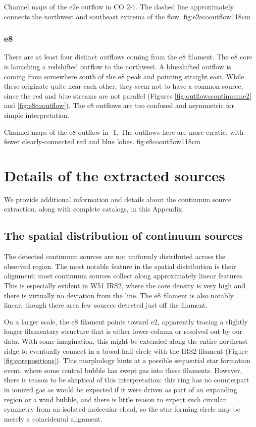 \documentclass{emulateapj}
\begin{document}
{Channel maps of the e2e outflow in CO 2-1.  The dashed line approximately
connects the northwest and southeast extrema of the flow.}
{fig:e2ecooutflow}{1}{18cm}

\subsubsection{e8}
There are at least four distinct outflows coming from the e8 filament.
The e8 core is launching a redshifted outflow to the northwest.  A blueshifted
outflow is coming from somewhere south of the e8 peak and pointing straight
east.  While these originate quite near each other, they seem not to have
a common source, since the red and blue streams are not parallel (Figures
\ref{fig:outflowscontinuume2} and \ref{fig:e8cooutflow}).  The e8 outflows are too
confused and asymmetric for simple interpretation.


{Channel maps of the e8 outflow in -1.  The outflows here are more
erratic, with fewer clearly-connected red and blue lobes.}
{fig:e8cooutflow}{1}{18cm}

\section{Details of the extracted sources}
\label{sec:contsrcs}
We provide additional information and details about the continuum
source extraction, along with complete catalogs, in this Appendix.

\subsection{The spatial distribution of continuum sources}
\label{sec:corespatialdistribution}
The detected continuum sources are not uniformly distributed across the
observed region.  The most notable feature in the spatial distribution is their
alignment: most continuum sources collect along approximately linear features.
This is especially evident in W51 IRS2, where the core density is very high and
there is virtually no deviation from the line.  The e8 filament is also notably
linear, though there area few sources detected just off the filament. 

On a larger scale, the e8 filament points toward e2, apparently tracing a
slightly longer filamentary structure that is either lower-column or resolved
out by our data.  With some imagination, this might be extended along the
entire northeast ridge to eventually connect in a broad half-circle with the
IRS2 filament (Figure \ref{fig:corepositions}).  This morphology hints at a
possible sequential star formation event, where some central bubble has swept
gas into these filaments.  However, there is reason to be skeptical of this
interpretation: this ring has no counterpart in ionized gas as would be
expected if it were driven as part of an expanding \hii region or a wind
bubble, and there is little reason to expect such circular symmetry from an
isolated molecular cloud, so the star forming circle may be merely a
coincidental alignment.
\end{document}

